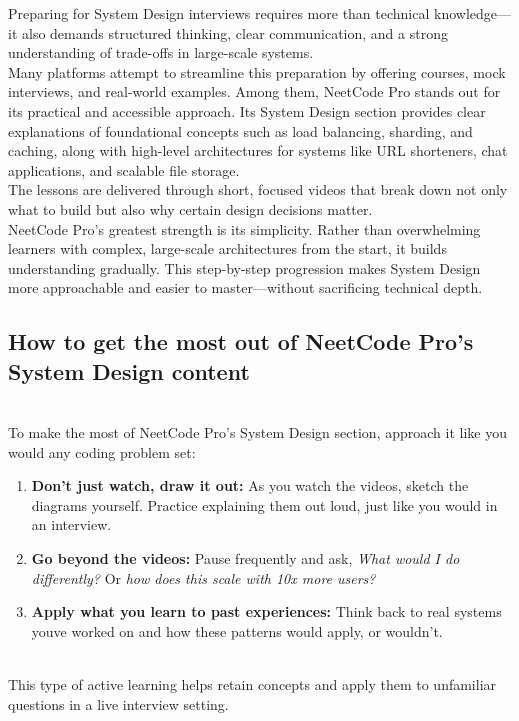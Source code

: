 

Preparing for System Design interviews requires more than technical knowledge---it also demands structured thinking, clear communication, and a strong understanding of trade-offs in large-scale systems.
\\
Many platforms attempt to streamline this preparation by offering courses, mock interviews, and real-world examples. Among them, NeetCode Pro stands out for its practical and accessible approach. Its System Design section provides clear explanations of foundational concepts such as load balancing, sharding, and caching, along with high-level architectures for systems like URL shorteners, chat applications, and scalable file storage.
\\
The lessons are delivered through short, focused videos that break down not only what to build but also why certain design decisions matter.
\\
NeetCode Pro's greatest strength is its simplicity. Rather than overwhelming learners with complex, large-scale architectures from the start, it builds understanding gradually. This step-by-step progression makes System Design more approachable and easier to master---without sacrificing technical depth.

\subsection{How to get the most out of NeetCode Pro's System Design content}\label{O5S3Khg5aoJZrWyg0Czuj}
\\
To make the most of NeetCode Pro's System Design section, approach it like you would any coding problem set:

\begin{enumerate}
\item
\protect{}\label{4mPH29EQ9i_HmiDIV8wTx}
\textbf{Don't just watch, draw it out:} As you watch the videos, sketch the diagrams yourself. Practice explaining them out loud, just like you would in an interview.
\item
\protect{}\label{1HimbRZw4uMLOC7KFjfcl}
\textbf{Go beyond the videos:} Pause frequently and ask, \emph{What would I do differently?} Or \emph{how does this scale with 10x more users?}
\item
\protect{}\label{pjjG14EDwzaSzQjq8xE79}
\textbf{Apply what you learn to past experiences:} Think back to real systems you\textquotesingle ve worked on and how these patterns would apply, or wouldn't.
\end{enumerate}
\\
This type of active learning helps retain concepts and apply them to unfamiliar questions in a live interview setting.

